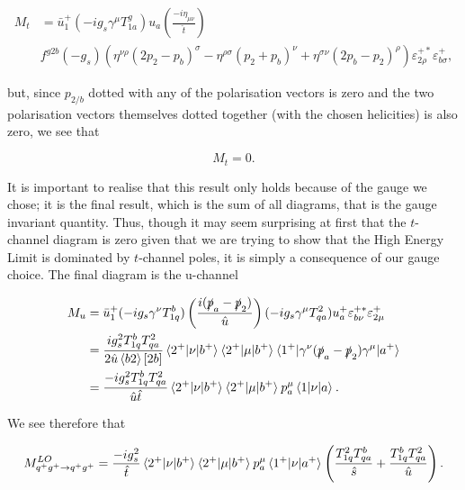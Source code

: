 \begin{equation}
\begin{split}
M_t & = \bar{u}_1^+ (- i g_s \gamma^\mu T^g_{1a}) u_a \left(\frac{-i \eta_{\mu \nu}}{\hat{t}} \right) \\
& f^{g2b}(-g_s)(\eta^{\nu \rho}(2 p_2 - p_b)^\sigma - \eta^{\rho \sigma}(p_2 + p_b)^\nu + \eta^{\sigma \nu}(2 p_b - p_2)^\rho) \varepsilon_{2 \rho}^{+*} \varepsilon_{b \sigma}^+,
\end{split}
\end{equation}

but, since $p_{2/b}$ dotted with any of the polarisation vectors is zero and the two polarisation vectors themselves dotted together (with the chosen helicities) is also zero, we see that

\begin{equation}
M_t = 0.
\end{equation}

It is important to realise that this result only holds because of the gauge we chose; it is the final result, which is the sum of all diagrams, that is the gauge invariant quantity. Thus, though it may seem surprising at first that the $t$-channel diagram is zero given that we are trying to show that the High Energy Limit is dominated by $t$-channel poles, it is simply a consequence of our gauge choice. The final diagram is the u-channel

\begin{equation}
\begin{split}
M_u &= \bar{u}^+_1 (- i g_s \gamma^\nu T^b_{1q}) \left( \frac{i(\slashed{p}_a - \slashed{p}_2)}{\hat{u}}\right)(- ig_s \gamma^\mu T^2_{qa}) u_a^+ \varepsilon_{b \nu}^{+*} \varepsilon_{2 \mu}^+ \\
&= \frac{i g_s^2 T^b_{1q}T^2_{qa}}{2 \hat{u} \left<b 2 \right> [2b]} \mathinner{\langle2^+\vert\nu\vert b^+\rangle}_{} \mathinner{\langle2^+\vert\mu\vert b^+\rangle}_{} \mathinner{\langle1^+\vert\gamma^\nu (\slashed{p}_a - \slashed{p}_2) \gamma^\mu\vert a^+\rangle}_{} \\
&= \frac{-i g_s^2 T^b_{1q}T^2_{qa}}{\hat{u} \hat{t}} \mathinner{\langle2^+\vert\nu\vert b^+\rangle}_{} \mathinner{\langle2^+\vert\mu\vert b^+\rangle}_{} p_a^\mu \mathinner{\langle1\vert\nu\vert a\rangle}_{}.
\end{split}
\end{equation}

We see therefore that

\begin{equation}
M_{q^+g^+ \to q^+g^+}^{LO} = \frac{-i g_s^2}{\hat{t}}\mathinner{\langle2^+\vert\nu\vert b^+\rangle}_{} \mathinner{\langle2^+\vert\mu\vert b^+\rangle}_{}p_a^\mu \mathinner{\langle1^+\vert\nu\vert a^+\rangle}_{}\left(\frac{T^2_{1q}T^b_{qa}}{\hat{s}} + \frac{T^b_{1q}T^2_{qa}}{\hat{u}} \right).
\end{equation}

